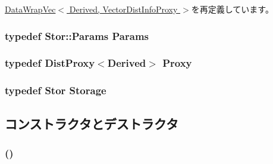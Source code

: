 \hyperlink{classStats_1_1DataWrapVec_a76d2c248839f34168d2a3760bc1fbdb9}{DataWrapVec$<$ Derived, VectorDistInfoProxy $>$}を再定義しています。\hypertarget{classStats_1_1VectorDistBase_a24c5f88dc162c95e0b32ade67a7ea674}{
\subsubsection[{Params}]{\setlength{\rightskip}{0pt plus 5cm}typedef Stor::Params {\bf Params}}}
\label{classStats_1_1VectorDistBase_a24c5f88dc162c95e0b32ade67a7ea674}
\hypertarget{classStats_1_1VectorDistBase_a9d0b15c55b5b57de51b840bbe83fc971}{
\subsubsection[{Proxy}]{\setlength{\rightskip}{0pt plus 5cm}typedef {\bf DistProxy}$<$Derived$>$ {\bf Proxy}}}
\label{classStats_1_1VectorDistBase_a9d0b15c55b5b57de51b840bbe83fc971}
\hypertarget{classStats_1_1VectorDistBase_a5d4a6db0e7c32292f54a08d05c671bd1}{
\subsubsection[{Storage}]{\setlength{\rightskip}{0pt plus 5cm}typedef Stor {\bf Storage}}}
\label{classStats_1_1VectorDistBase_a5d4a6db0e7c32292f54a08d05c671bd1}


\subsection{コンストラクタとデストラクタ}
\hypertarget{classStats_1_1VectorDistBase_a316aa069cefd2a3279fa3ec781118789}{
\subsubsection[{VectorDistBase}]{ ()}}
\label{classStats_1_1VectorDistBase_a316aa069cefd2a3279fa3ec781118789}



